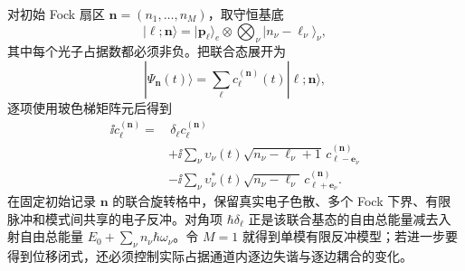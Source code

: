 对初始 Fock 扇区
$\mathbf n=(n_1,\ldots,n_M)$，取守恒基底
\[
 |\boldsymbol\ell;\mathbf n\rangle
 =
 |\mathbf p_{\boldsymbol\ell}\rangle_e
 \otimes
 \bigotimes_\nu
 |n_\nu-\ell_\nu\rangle_\nu ,
\]
其中每个光子占据数都必须非负。把联合态展开为
\[
|\Psi_{\mathbf n}(t)\rangle
=
\sum_{\boldsymbol\ell}
c_{\boldsymbol\ell}^{(\mathbf n)}(t)
|\boldsymbol\ell;\mathbf n\rangle ,
\]
逐项使用玻色梯矩阵元后得到
\begin{equation}
\boxed{
\begin{aligned}
 \ii\dot c_{\boldsymbol\ell}^{(\mathbf n)}
 =&\,\delta_{\boldsymbol\ell}
 c_{\boldsymbol\ell}^{(\mathbf n)}\\
 &+\ii\sum_\nu \upsilon_\nu(t)
 \sqrt{n_\nu-\ell_\nu+1}\,
 c_{\boldsymbol\ell-\mathbf e_\nu}^{(\mathbf n)}\\
 &-\ii\sum_\nu \upsilon_\nu^*(t)
 \sqrt{n_\nu-\ell_\nu}\,
 c_{\boldsymbol\ell+\mathbf e_\nu}^{(\mathbf n)} .
\end{aligned}}
\label{eq:multimode_qpinem_lattice_dp47}
\end{equation}
在固定初始记录 $\mathbf n$ 的联合旋转格中，保留真实电子色散、多个 Fock 下界、有限脉冲和模式间共享的电子反冲。对角项 $\hbar\delta_{\boldsymbol\ell}$ 正是该联合基态的自由总能量减去入射自由总能量 $E_0+\sum_\nu n_\nu\hbar\omega_\nu$。令 $M=1$ 就得到单模有限反冲模型；若进一步要得到位移闭式，还必须控制实际占据通道内逐边失谐与逐边耦合的变化。

